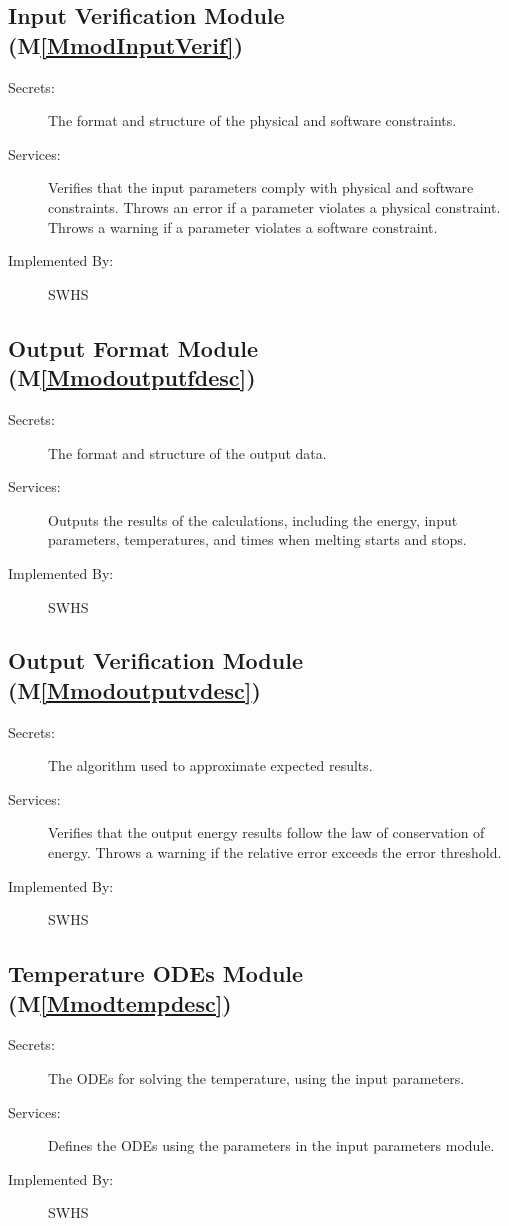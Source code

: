 \documentclass[12pt]{article}
\begin{document}
\subsection{Input Verification Module (M\ref{MmodInputVerif})}
\label{Sec:InpuVeriModu()}
\begin{description}
\item[Secrets:]The format and structure of the physical and software constraints.
\item[Services:]Verifies that the input parameters comply with physical and software constraints. Throws an error if a parameter violates a physical constraint. Throws a warning if a parameter violates a software constraint.
\item[Implemented By:]SWHS
\end{description}
\subsection{Output Format Module (M\ref{Mmodoutputfdesc})}
\label{Sec:OutpFormModu()}
\begin{description}
\item[Secrets:]The format and structure of the output data.
\item[Services:]Outputs the results of the calculations, including the energy, input parameters, temperatures, and times when melting starts and stops.
\item[Implemented By:]SWHS
\end{description}
\subsection{Output Verification Module (M\ref{Mmodoutputvdesc})}
\label{Sec:OutpVeriModu()}
\begin{description}
\item[Secrets:]The algorithm used to approximate expected results.
\item[Services:]Verifies that the output energy results follow the law of conservation of energy. Throws a warning if the relative error exceeds the error threshold.
\item[Implemented By:]SWHS
\end{description}
\subsection{Temperature ODEs Module (M\ref{Mmodtempdesc})}
\label{Sec:TempODEsModu()}
\begin{description}
\item[Secrets:]The ODEs for solving the temperature, using the input parameters.
\item[Services:]Defines the ODEs using the parameters in the input parameters module.
\item[Implemented By:]SWHS
\end{description}
\end{document}
